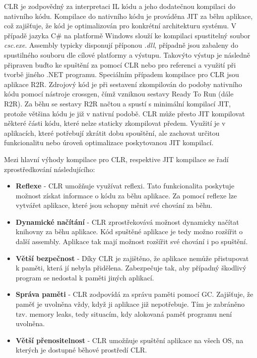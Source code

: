 
CLR je zodpovědný za interpretaci IL kódu a jeho dodatečnou kompilaci do nativního kódu. Kompilace do nativního kódu je prováděna JIT za běhu aplikace, což zajišťuje, že kód je optimalizován pro konkrétní architekturu systému. V případě jazyka C\# na platformě Windows slouží ke kompilaci spustitelný soubor \emph{csc.exe}. Assembly typicky disponují příponou \emph{.dll}, případně jsou zabaleny do spustilného souboru dle cílové platformy a výstupu. Takovýto výstup je následně připraven buďto ke spuštění za pomocí CLR nebo pro referenci a využití při tvorbě jiného .NET programu. \cite{Richter2012} Speciálním případem kompilace pro CLR jsou aplikace R2R. Zdrojový kód je při sestavení zkompilován do podoby nativního kódu pomocí nástroje crossgen, čímž vzniknou sestavy Ready To Run (dále R2R). Za běhu se sestavy R2R načtou a spustí s minimální kompilací JIT, protože většina kódu je již v nativní podobě. CLR může přesto JIT kompilovat některé části kódu, které nelze staticky zkompilovat předem. \cite{netdocsr2r} Využití je v aplikacích, které potřebují zkrátit dobu spouštění, ale zachovat určitou funkcionalitu nebo úroveň optimalizace poskytovanou JIT kompilací.

Mezi hlavní výhody kompilace pro CLR, respektive JIT kompilace se řadí zprostředkování následujícího:

\begin{itemize}
    \item  \textbf{Reflexe} - CLR umožňuje využívat reflexi. Tato funkcionalita poskytuje možnost získat informace o kódu za běhu aplikace. Za pomocí reflexe lze vytvářet aplikace, které jsou schopny měnit své chování za běhu.
    \item \textbf{Dynamické načítání} - CLR zprostřekovává možnost dynamicky načítat knihovny za běhu aplikace. Kód spuštěné aplikace je tedy možno rozšířit o další assembly. Aplikace tak mají možnost rozšířit své chování i po spuštění.
    \item \textbf{Větší bezpečnost} - Díky CLR je zajištěno, že aplikace nemůže přistupovat k paměti, která jí nebyla přidělena. Zabezpečuje tak, aby případný škodlivý program se nedostal k paměti jiných aplikací.
    \item \textbf{Správa paměti} - CLR zodpovídá za správu paměti pomocí GC. Zajišťuje, že paměť je uvolněna vždy, když ji aplikace již nepotřebuje. Tím je zabráněno tzv. memory leaks, tedy situacím, kdy alokovaná paměť programu není uvolněna.
    \item \textbf{Větší přenositelnost} - CLR umožňuje spuštění aplikace na všech OS, na kterých je dostupné běhové prostředí CLR.
\end{itemize}

